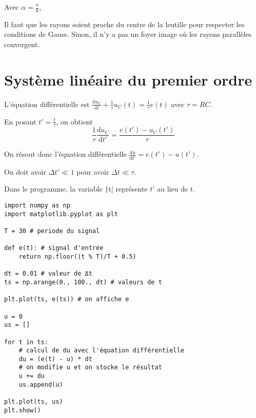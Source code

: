 \documentclass[a4paper]{report}
\begin{document}
	Avec $\alpha = \frac{\pi}{6}$,
	\begin{figure}[H]
		\centering
		
	\end{figure}

	Il faut que les rayons soient proche du centre de la lentille pour respecter les conditions de Gauss.
	Sinon, il n'y a pas un foyer image où les rayons parallèles convergent.

	\section{Système linéaire du premier ordre}

	L'équation différentielle est $\frac{\mathrm{d}u_C}{\mathrm{d}t} + \frac{1}{\tau}u_C(t) = \frac{1}{\tau}e(t)$ avec $\tau = RC$.

	En posant $t' = \frac{t}{\tau}$, on obtient
	\[
		\frac{1}{\tau} \frac{\mathrm{d}u_C}{\mathrm{d}t'} = \frac{e(t') - u_C(t')}{\tau}
	\]

	On résout donc l'équation différentielle $\frac{\mathrm{d}u}{\mathrm{d}t'} = e(t') - u(t')$.

	On doit avoir $\Delta t' \ll 1$ pour avoir $\Delta t \ll \tau$.

	Dans le programme, la variable \texttt|t| représente $t'$ au lieu de $t$.

	\begin{verbatim}
import numpy as np
import matplotlib.pyplot as plt

T = 30 # periode du signal

def e(t): # signal d'entrée
    return np.floor((t % T)/T + 0.5)

dt = 0.01 # valeur de Δt
ts = np.arange(0., 100., dt) # valeurs de t

plt.plot(ts, e(ts)) # on affiche e

u = 0
us = []

for t in ts:
    # calcul de du avec l'équation différentielle
    du = (e(t) - u) * dt
    # on modifie u et on stocke le résultat
    u += du
    us.append(u)

plt.plot(ts, us)
plt.show()
	\end{verbatim}

	\begin{figure}[H]
		\centering
		
	\end{figure}
\end{document}
